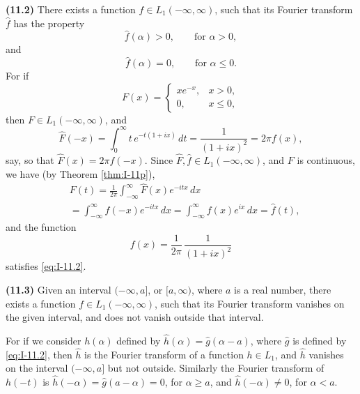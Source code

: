 \noindent\textbf{(11.2)} There exists a function $f\in L_1(-\infty,\infty)$, such that its Fourier transform $\widehat f$ has the property
\begin{equation}\label{eq:I-11.2}\tag{11.2}
\widehat f(\alpha)>0,\qquad\text{for }\alpha>0,
\end{equation}
and
\begin{equation*}
\widehat f(\alpha)=0,\qquad\text{for }\alpha\le 0.
\end{equation*}
For if
\begin{equation*}
F(x)=
\begin{cases}
xe^{-x},&x>0,\\
0,&x\le 0,
\end{cases}
\end{equation*}
then $F\in L_1(-\infty,\infty)$, and
\begin{equation*}
\widehat F(-x)=\int_{0}^{\infty}t\,e^{-t(1+ix)}\,dt=\frac{1}{(1+ix)^{2}}=2\pi f(x),
\end{equation*}
say, so that $\widehat F(x)=2\pi f(-x)$. Since $\widehat F,\widehat f\in L_1(-\infty,\infty)$, and $F$ is continuous, we have (by Theorem \ref{thm:I-11p}),
\begin{equation*}
\begin{aligned}
&F(t) = \frac{1}{2\pi}  \int_{-\infty}^{\infty}\widehat F(x)e^{-itx}\,dx\\
&= \int_{-\infty}^{\infty}f(-x)e^{-itx}\,dx = \int_{-\infty}^{\infty}f(x)e^{ix}\,dx = \widehat f(t),
\end{aligned}
\end{equation*}
and the function
\begin{equation*}
f(x)=\frac{1}{2\pi}\,\frac{1}{(1+ix)^{2}}
\end{equation*}
satisfies \eqref{eq:I-11.2}.

\noindent\textbf{(11.3)} Given an interval $(-\infty,a]$, or $[a,\infty)$, where $a$ is a real number, there exists a function $f\in L_1(-\infty,\infty)$, such that its Fourier transform vanishes on the given interval, and does not vanish outside that interval.

For if we consider $h(\alpha)$ defined by $\widehat h(\alpha)=\widehat g(\alpha-a)$, where $\widehat g$ is defined by \eqref{eq:I-11.2}, then $\widehat h$ is the Fourier transform of a function $h\in L_1$, and $\widehat h$ vanishes on the interval $(-\infty,a]$ but not outside. Similarly the Fourier transform of $h(-t)$ is $\widehat h(-\alpha)=\widehat g(a-\alpha)=0$, for $\alpha\ge a$, and $\widehat h(-\alpha)\neq 0$, for $\alpha<a$.

